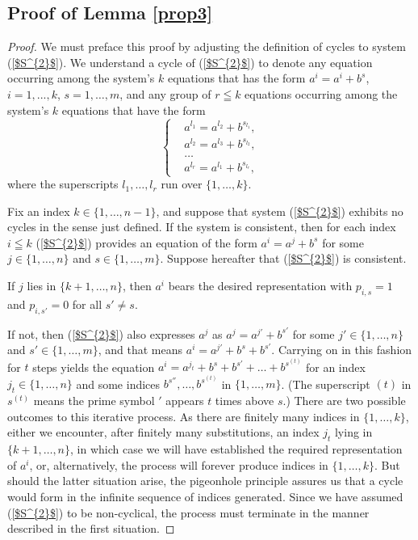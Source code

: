\documentclass[pdflatex,sn-apa,11pt]{sn-jnl}%
\begin{document}
\subsection{Proof of Lemma \ref{prop3}}
\label{sec5_1}
\begin{proof}

We must preface this proof by adjusting the definition of cycles to system (\ref{$S^{2}$}). We understand a cycle of (\ref{$S^{2}$}) to denote any equation occurring among the system's $k$ equations that has the form $a^i = a^i + b^s$, $i = 1, ..., k$, $s = 1, \dots, m$, and any group of $r \leqq k$ equations occurring among the system's $k$ equations that have the form
\begin{equation*}
  \left\{
    \begin{aligned}
      & a^{l_1} = a^{l_2} + b^{s_{l_1}}, \\
      & a^{l_2} = a^{l_3} + b^{s_{l_2}}, \\
      & \dots \\
      & a^{l_r} = a^{l_1} + b^{s_{l_r}},
    \end{aligned}
  \right.
\end{equation*}where the superscripts $l_1, \dots, l_r$ run over $\{1, \dots, k\}$.  

Fix an index $k \in \{1, \dots, n-1\}$, and suppose that system (\ref{$S^{2}$}) exhibits no cycles in the sense just defined. If the system is consistent, then for each index $i \leqq k$ (\ref{$S^{2}$}) provides an equation of the form $a^i = a^{j} + b^{s}$ for some $j \in \{1, \dots, n\}$ and $s \in \{1, \dots, m\}$. Suppose hereafter that (\ref{$S^{2}$}) is consistent.

If $j$ lies in $\{k+1, \dots, n\}$, then $a^i$ bears the desired representation with $p_{i, s} = 1$ and $p_{i, s'} = 0$ for all $s' \neq s$.

If not, then (\ref{$S^{2}$}) also expresses $a^{j}$ as $a^{j} = a^{j'} + b^{s'}$ for some $j' \in \{1, \dots, n\}$ and $s' \in \{1, \dots, m\}$, and that means $a^i = a^{j'} + b^{s} + b^{s'}$. Carrying on in this fashion for $t$ steps yields the equation $a^i = a^{j_t} + b^{s} + b^{s'} + \dots + b^{s^{(t)}}$ for an index $j_t \in \{1, \dots, n\}$ and some indices $b^{s''}, \dots, b^{s^{(t)}}$ in $\{1, \dots, m\}$. (The superscript $(t)$ in $s^{(t)}$ means the prime symbol $'$ appears $t$ times above $s$.) There are two possible outcomes to this iterative process. As there are finitely many indices in $\{1, \dots, k\}$, either we encounter, after finitely many substitutions, an index $j_t$ lying in $\{k+1, \dots, n\}$, in which case we will have established the required representation of $a^i$, or, alternatively, the process will forever produce indices in $\{1, \dots, k\}$. But should the latter situation arise, the pigeonhole principle assures us that a cycle would form in the infinite sequence of indices generated. Since we have assumed (\ref{$S^{2}$}) to be non-cyclical, the process must terminate in the manner described in the first situation.
\end{proof}
\end{document}
